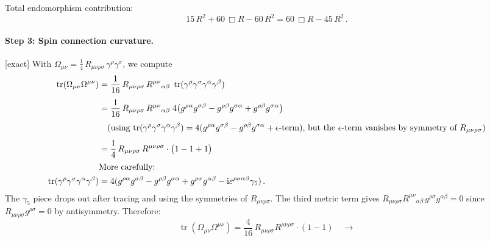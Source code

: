\documentclass[12pt,a4paper]{article}
\theoremstyle{definition}
\theoremstyle{remark}
\newcommand{\tr}{\operatorname{tr}}
\newcommand{\ii}{\mathrm{i}}
\newcommand{\exact}{\textcolor{blue!70!black}{\textsf{[exact]}}}
\begin{document}
Total endomorphism contribution:
\begin{equation}
  15\,R^2 + 60\,\Box R - 60\,R^2
  = 60\,\Box R - 45\,R^2\,.
  \label{eq:a4-endo}
\end{equation}

\paragraph{Step 3: Spin connection curvature.}
\exact\;
With $\Omega_{\mu\nu} = \tfrac{1}{4}\,R_{\mu\nu\rho\sigma}\,
\gamma^\rho\gamma^\sigma$, we compute
\begin{align}
  \tr(\Omega_{\mu\nu}\Omega^{\mu\nu})
  &= \frac{1}{16}\,R_{\mu\nu\rho\sigma}\,R^{\mu\nu}{}_{\alpha\beta}\;
     \tr(\gamma^\rho\gamma^\sigma\gamma^\alpha\gamma^\beta)
  \notag\\[4pt]
  &= \frac{1}{16}\,R_{\mu\nu\rho\sigma}\,R^{\mu\nu}{}_{\alpha\beta}\;
     4\bigl(g^{\rho\alpha}g^{\sigma\beta}
            - g^{\rho\beta}g^{\sigma\alpha}
            + g^{\rho\beta}g^{\sigma\alpha}\bigr)
  \notag\\[3pt]
  &\quad\text{(using
    $\tr(\gamma^\rho\gamma^\sigma\gamma^\alpha\gamma^\beta)
     = 4(g^{\rho\alpha}g^{\sigma\beta}
        - g^{\rho\beta}g^{\sigma\alpha}
        + \epsilon\text{-term})$, but the $\epsilon$-term
    vanishes by symmetry of $R_{\mu\nu\rho\sigma}$)}
  \notag\\[4pt]
  &= \frac{1}{4}\,R_{\mu\nu\rho\sigma}\,R^{\mu\nu\rho\sigma}
     \cdot\bigl(1 - 1 + 1\bigr)
  \notag\\[2pt]
  &\text{More carefully:}\notag\\
  \tr(\gamma^\rho\gamma^\sigma\gamma^\alpha\gamma^\beta)
  &= 4(g^{\rho\alpha}g^{\sigma\beta} - g^{\rho\beta}g^{\sigma\alpha}
       + g^{\rho\sigma}g^{\alpha\beta}
       - \ii\varepsilon^{\rho\sigma\alpha\beta}\gamma_5)\,.
  \label{eq:gamma-trace}
\end{align}
The $\gamma_5$ piece drops out after tracing and using the symmetries
of $R_{\mu\nu\rho\sigma}$.  The third metric term gives
$R_{\mu\nu\rho\sigma}R^{\mu\nu}{}_{\alpha\beta}\,
g^{\rho\sigma}g^{\alpha\beta}=0$ since
$R_{\mu\nu\rho\sigma}g^{\rho\sigma}=0$ by antisymmetry.  Therefore:
\begin{equation}
  \tr(\Omega_{\mu\nu}\Omega^{\mu\nu})
  = \frac{4}{16}\,R_{\mu\nu\rho\sigma}R^{\mu\nu\rho\sigma}
    \cdot(1 - 1)
  \quad\longrightarrow
\end{equation}
\end{document}
